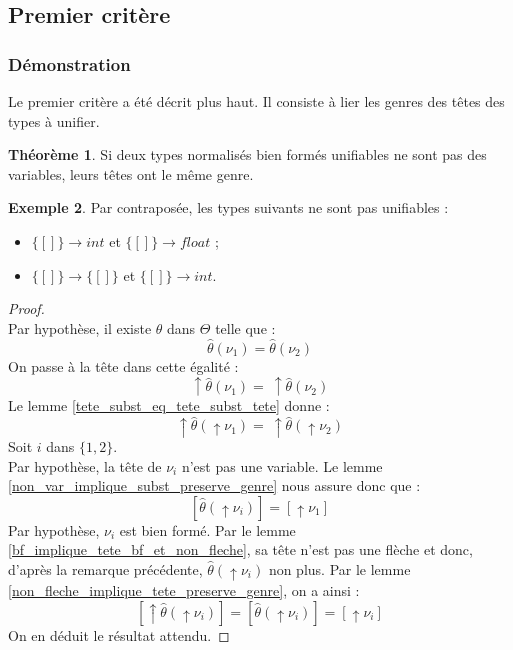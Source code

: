 \documentclass[a4paper]{report}
\newenvironment{preuve} 
  {\begin{proof}~\\} 
  {\end{proof}}
\theoremstyle{definition}
\newtheorem{theoreme}{Théorème}
\newtheorem{exemple}[theoreme]{Exemple}
\newcommand{\mset}[1]{\{\![#1]\!\}}
\begin{document}
\subsection{Premier critère}

\subsubsection{Démonstration}

Le premier critère a été décrit plus haut. Il consiste à lier les genres des têtes des types à unifier.

\begin{theoreme} \label{thm_cond1}
  Si deux types normalisés bien formés unifiables ne sont pas des variables, leurs têtes ont le même genre.
\end{theoreme}

\begin{exemple}
  Par contraposée, les types suivants ne sont pas unifiables :
  \begin{itemize}
    \item $\mset{} \rightarrow int$ et $\mset{} \rightarrow float$ ;
    \item $\mset{} \rightarrow \mset{}$ et $\mset{} \rightarrow int$.
  \end{itemize}
\end{exemple}

\begin{preuve}
  Par hypothèse, il existe $\theta$ dans $\Theta$ telle que :
  \[ \hat\theta (\nu_1) = \hat\theta (\nu_2) \]
  On passe à la tête dans cette égalité :
  \[ \uparrow \hat\theta (\nu_1) =\ \uparrow \hat\theta (\nu_2) \]
  Le lemme \ref{tete_subst_eq_tete_subst_tete} donne :
  \[ \uparrow \hat\theta (\uparrow \nu_1) =\ \uparrow \hat\theta (\uparrow \nu_2) \]
  Soit $i$ dans $\{ 1, 2 \}$. \\
  Par hypothèse, la tête de $\nu_i$ n'est pas une variable. Le lemme \ref{non_var_implique_subst_preserve_genre} nous assure donc que :
  \[ [ \hat\theta (\uparrow \nu_i) ] = [ \uparrow \nu_1 ] \]
  Par hypothèse, $\nu_i$ est bien formé. Par le lemme \ref{bf_implique_tete_bf_et_non_fleche}, sa tête n'est pas une flèche et donc, d'après la remarque précédente, $\hat\theta (\uparrow \nu_i)$ non plus. Par le lemme \ref{non_fleche_implique_tete_preserve_genre}, on a ainsi :
  \[ [ \uparrow \hat\theta (\uparrow \nu_i) ] = [ \hat\theta (\uparrow \nu_i) ] = [ \uparrow \nu_i ] \]
  On en déduit le résultat attendu.
\end{preuve}
\end{document}
